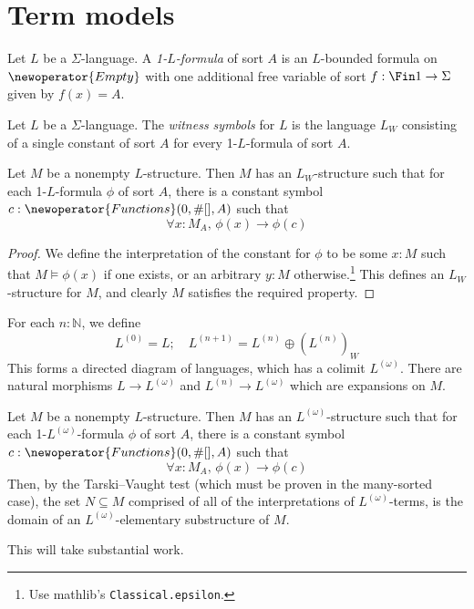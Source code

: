 \section{Term models}
\begin{definition}
  Let \( L \) be a \( \Sigma \)-language.
  A \emph{1-\( L \)-formula} of sort \( A \) is an \( L \)-bounded formula on \( \newoperator{Empty} \) with one additional free variable of sort \( f : \Fin 1 \to \Sigma \) given by \( f(x) = A \).
\end{definition}
\begin{definition}
  Let \( L \) be a \( \Sigma \)-language.
  The \emph{witness symbols} for \( L \) is the language \( L_W \) consisting of a single constant of sort \( A \) for every 1-\( L \)-formula of sort \( A \).
\end{definition}
\begin{proposition}
  Let \( M \) be a nonempty \( L \)-structure.
  Then \( M \) has an \( L_W \)-structure such that for each 1-\( L \)-formula \( \phi \) of sort \( A \), there is a constant symbol \( c : \newoperator{Functions}(0, \#[], A) \) such that
  \[ \forall x : M_A,\, \phi(x) \to \phi(c) \]
\end{proposition}
\begin{proof}
  We define the interpretation of the constant for \( \phi \) to be some \( x : M \) such that \( M \vDash \phi(x) \) if one exists, or an arbitrary \( y : M \) otherwise.\footnote{Use mathlib's \texttt{Classical.epsilon}.}
  This defines an \( L_W \)-structure for \( M \), and clearly \( M \) satisfies the required property.
\end{proof}
\begin{definition}
  For each \( n : \mathbb N \), we define
  \[ L^{(0)} = L;\quad L^{(n+1)} = L^{(n)} \oplus (L^{(n)})_W \]
  This forms a directed diagram of languages, which has a colimit \( L^{(\omega)} \).
  There are natural morphisms \( L \to L^{(\omega)} \) and \( L^{(n)} \to L^{(\omega)} \) which are expansions on \( M \).
\end{definition}
\begin{proposition}
  Let \( M \) be a nonempty \( L \)-structure.
  Then \( M \) has an \( L^{(\omega)} \)-structure such that for each 1-\( L^{(\omega)} \)-formula \( \phi \) of sort \( A \), there is a constant symbol \( c : \newoperator{Functions}(0, \#[], A) \) such that
  \[ \forall x : M_A,\, \phi(x) \to \phi(c) \]
  Then, by the Tarski--Vaught test (which must be proven in the many-sorted case), the set \( N \subseteq M \) comprised of all of the interpretations of \( L^{(\omega)} \)-terms, is the domain of an \( L^{(\omega)} \)-elementary substructure of \( M \).
\end{proposition}
This will take substantial work.

